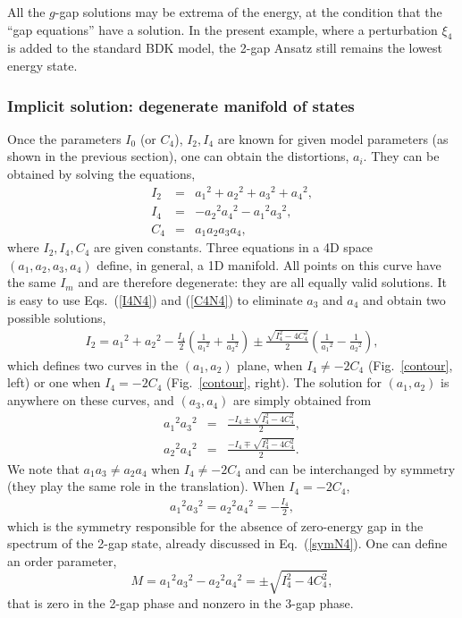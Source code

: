 \documentclass[]{revtex4-1}
\begin{document}
All the $g$-gap solutions may be extrema of the energy, at the condition that the ``gap equations'' have a solution.
In the present example, where a perturbation $\xi_4$ is added to the standard BDK model, the 2-gap Ansatz still remains the lowest energy state.

\subsubsection{Implicit solution: degenerate manifold of states }
\label{explsolN4}

Once the parameters $I_0$ (or $C_4$), $I_2,I_4$ are known for given model parameters (as shown in the previous section), one can obtain the distortions, $a_i$. They can be obtained by solving the equations,
\begin{eqnarray}
 I_2 &=& {a_1}^2+{a_2}^2+{a_3}^2+{a_4}^2,  \label{I2N4}\\
  I_4 &=&  -{a_2}^2{a_4}^2-{a_1}^2{a_3}^2,  \label{I4N4}\\
   C_4 &=& a_1a_2a_3a_4, \label{C4N4}
\end{eqnarray}
where $I_2,I_4, C_4$ are given constants. Three equations in a 4D space $(a_1,a_2,a_3,a_4)$ define, in general, a 1D manifold. All points on this curve have the same $I_m$ and are therefore degenerate: they are all equally valid solutions. It is easy to use Eqs.~(\ref{I4N4}) and (\ref{C4N4}) to eliminate $a_3$ and $a_4$ and obtain two possible solutions,
\begin{eqnarray}
  I_2 = {a_1}^2+{a_2}^2-  \frac{I_4}{2} \left( \frac{1}{{a_1}^2} + \frac{1}{ {a_2}^2} \right) \pm  \frac{\sqrt{I_4^2-4C_4^2}}{2}  \left(\frac{1}{{a_1}^2} - \frac{1}{ {a_2}^2} \right), \label{firstcurve} 
\end{eqnarray}
which defines two curves in the $(a_1,a_2)$ plane, when $I_4 \neq -2C_4$ (Fig.~\ref{contour}, left) or one when $I_4=-2C_4$ (Fig.~\ref{contour}, right). The solution for $(a_1,a_2)$ is anywhere on these curves, and $(a_3,a_4)$ are simply obtained from
\begin{eqnarray}
  {a_1}^2{a_3}^2 &=& \frac{-I_4 \pm \sqrt{I_4^2-4C_4^2}}{2}, \\
  {a_2}^2{a_4}^2 &=& \frac{-I_4 \mp \sqrt{I_4^2-4C_4^2}}{2}.
   \end{eqnarray}
We note that $a_1a_3 \neq a_2a_4$ when $I_4\neq -2C_4$ and can be interchanged by symmetry (they play the same role in the translation). When $I_4=-2C_4$,
\begin{eqnarray}
  {a_1}^2{a_3}^2 =   {a_2}^2{a_4}^2 = -\frac{I_4}{2}, 
     \end{eqnarray}
which is the symmetry responsible for the absence of zero-energy gap in the spectrum of the 2-gap state, already discussed in Eq.~(\ref{symN4}).
One can define an order parameter,
\begin{equation}
M={a_1}^2{a_3}^2-{a_2}^2{a_4}^2 = \pm \sqrt{I_4^2-4C_4^2},
\end{equation}
that is zero in the 2-gap phase and nonzero in the 3-gap phase.
\end{document}
